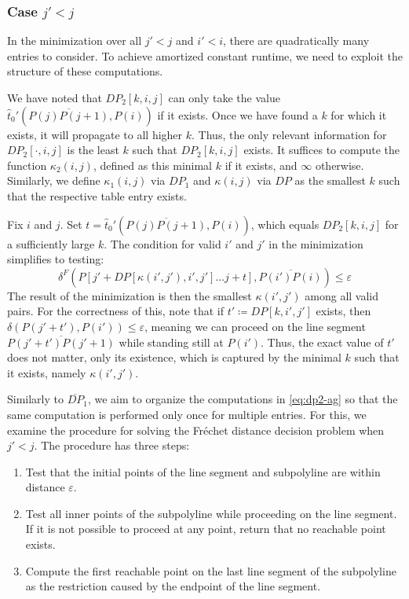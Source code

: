 \subsubsection{Case \(j' < j\)}

In the minimization over all \(j' < j\) and \(i' < i\), there are quadratically many entries to consider. To achieve amortized constant runtime, we need to exploit the structure of these computations.

We have noted that \(DP_2[k,i,j]\) can only take the value \(\hat t_0'(\overline{P(j)P(j+1)}, P(i))\) if it exists. Once we have found a \(k\) for which it exists, it will propagate to all higher \(k\). Thus, the only relevant information for \(DP_2[\cdot, i, j]\) is the least \(k\) such that \(DP_2[k,i,j]\) exists. It suffices to compute the function \(\kappa_2(i,j)\), defined as this minimal \(k\) if it exists, and \(\infty\) otherwise. Similarly, we define \(\kappa_1(i,j)\) via \(DP_1\) and \(\kappa(i,j)\) via \(DP\) as the smallest \(k\) such that the respective table entry exists.

Fix \(i\) and \(j\). Set \(t = \hat t_0'(\overline{P(j)P(j+1)}, P(i))\), which equals \(DP_2[k, i, j]\) for a sufficiently large \(k\). The condition for valid \(i'\) and \(j'\) in the minimization simplifies to testing:
\begin{equation}\label{eq:dp2-ag}
	\delta^F(P[j' + DP[\kappa(i', j'),i', j'] \dots j + t], \overline{P(i')P(i)}) \leq \varepsilon
\end{equation}
The result of the minimization is then the smallest \(\kappa(i', j')\) among all valid pairs. For the correctness of this, note that if \(t' \coloneq DP[k, i', j']\) exists, then \(\delta(P(j' + t'), P(i')) \leq \varepsilon\), meaning we can proceed on the line segment \(\overline{P(j' + t')P(j' + 1)}\) while standing still at \(P(i')\). Thus, the exact value of \(t'\) does not matter, only its existence, which is captured by the minimal \(k\) such that it exists, namely \(\kappa(i',j')\).


Similarly to \(\overline{DP}_1\), we aim to organize the computations in \cref{eq:dp2-ag} so that the same computation is performed only once for multiple entries. For this, we examine the procedure for solving the Fréchet distance decision problem when \(j' < j\). The procedure has three steps:
\begin{enumerate}
	\item Test that the initial points of the line segment and subpolyline are within distance \(\varepsilon\).
	\item Test all inner points of the subpolyline while proceeding on the line segment. If it is not possible to proceed at any point, return that no reachable point exists.
	\item Compute the first reachable point on the last line segment of the subpolyline as the restriction caused by the endpoint of the line segment.
\end{enumerate}

